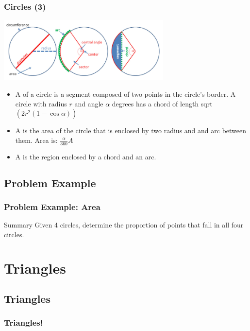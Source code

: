 \documentclass{beamer}
\begin{document}
\begin{frame}
  \frametitle{Circles (3)}
  {\smaller
    \begin{center}
      \includegraphics[width=0.65\textwidth]{../img/circle_halim}
    \end{center}
  
  \begin{itemize}
  \item A  of a circle is a segment composed of two points in the circle's border. A circle with radius $r$ and angle $\alpha$ degrees has a chord of length sqrt$(2r^2(1-\cos{\alpha}))$
  \item A  is the area of the circle that is enclosed by two radius and and arc between them. Area is: $\frac{\alpha}{360}A$
  \item A  is the region enclosed by a chord and an arc.

  \end{itemize}
  }
\end{frame}


\subsection{Problem Example}
\begin{frame}
  \frametitle{Problem Example: Area}

  \begin{block}{Summary}
    Given 4 circles, determine the proportion of points that fall in all four circles.
  \end{block}
  
\end{frame}


\section{Triangles}
\subsection{Triangles}
\begin{frame}
  \frametitle{Triangles!}
\end{frame}
\end{document}

